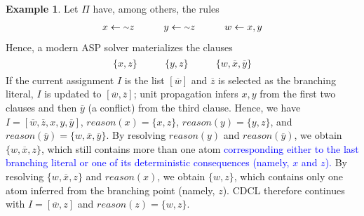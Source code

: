 \documentclass[preprint,authoryear]{elsarticle}
\def\naf{\ensuremath{\raise.17ex\hbox{\ensuremath{\scriptstyle\mathtt{\sim}}}}\xspace}
\theoremstyle{definition}
\newtheorem{example}{Example}[section]
\def\naf{\ensuremath{\raise.17ex\hbox{\ensuremath{\scriptstyle\mathtt{\sim}}}}\xspace}
\begin{document}
\begin{example}\label{ex:unit-propagation}
Let $\Pi$ have, among others, the rules
\begin{align*}
    \begin{array}{ccc}
        x \leftarrow \naf z \qquad &
        y \leftarrow \naf z \qquad &
        w \leftarrow x, y
    \end{array}
\end{align*}
Hence, a modern ASP solver materializes the clauses
\begin{align*}
    \begin{array}{ccc}
        \{x,z\} \qquad &
        \{y,z\} \qquad &
        \{w,\overline{x},\overline{y}\}
    \end{array}
\end{align*}
If the current assignment $I$ is the list $[\overline{w}]$ and $\overline{z}$ is selected as the branching literal, $I$ is updated to $[\overline{w}, \overline{z}]$; unit propagation infers $x,y$ from the first two clauses and then $\overline{y}$ (a conflict) from the third clause.
Hence, we have $I = [\overline{w}, \overline{z}, x, y, \overline{y}]$,
$\mathit{reason}(x) = \{x,z\}$,
$\mathit{reason}(y) = \{y,z\}$, and
$\mathit{reason}(\overline{y}) = \{w,\overline{x},\overline{y}\}$.
By resolving $\mathit{reason}(y)$ and $\mathit{reason}(\overline{y})$, we obtain $\{w,\overline{x},z\}$, which still contains more than one atom \textcolor{blue}{corresponding either to the last branching literal or one of its deterministic consequences (namely, $x$ and $z$).}
By resolving $\{w,\overline{x},z\}$ and $\mathit{reason}(x)$, we obtain $\{w,z\}$, which contains only one atom inferred from the branching point (namely, $z$).
CDCL therefore continues with $I = [\overline{w}, z]$ and $\mathit{reason}(z) = \{w,z\}$.
\end{example}
\end{document}
